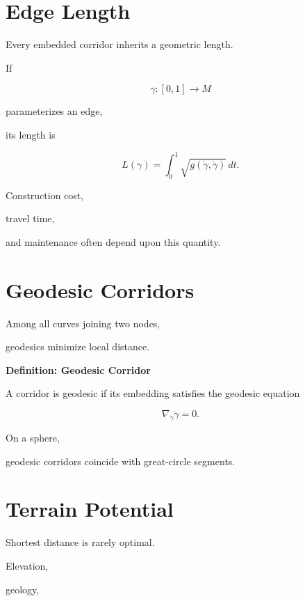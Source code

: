 \documentclass[11pt,fleqn]{book}
\numberwithin{equation}{chapter}
\newenvironment{definition}[1]
  {\begin{definitionEnv}
   \noindent\textbf{Definition: #1}\par\smallskip}
  {\end{definitionEnv}}
\theoremstyle{plain}
\theoremstyle{definition}
\theoremstyle{remark}
\begin{document}

\section{Edge Length}

Every embedded corridor inherits a geometric length.

If

\[
\gamma:[0,1]\rightarrow M
\]

parameterizes an edge,

its length is

\[
\boxed{
L(\gamma)
=
\int_0^1
\sqrt{
g(\dot\gamma,\dot\gamma)
}
\,dt.
}
\]

Construction cost,

travel time,

and maintenance often depend upon this quantity.


\section{Geodesic Corridors}

Among all curves joining two nodes,

geodesics minimize local distance.


\begin{definition}{Geodesic Corridor}

A corridor is geodesic if its embedding satisfies the geodesic equation

\[
\nabla_{\dot\gamma}\dot\gamma=0.
\]

\end{definition}

On a sphere,

geodesic corridors coincide with great-circle segments.


\section{Terrain Potential}

Shortest distance is rarely optimal.

Elevation,

geology,
\end{document}
